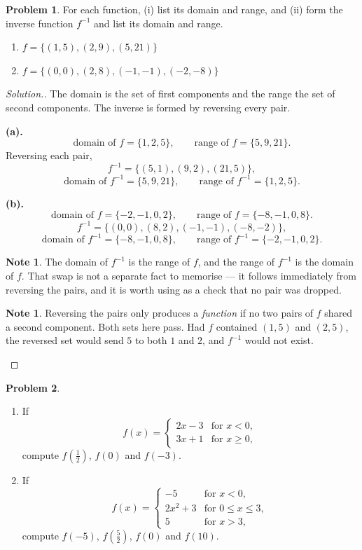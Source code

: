 \documentclass[11pt,a4paper]{article}
\theoremstyle{definition}
\newtheorem{note}[thm]{Note}
\newtheorem{problemx}{Problem}[section]
\newenvironment{problem}{\begin{problemx}}{\end{problemx}}
\newenvironment{solution}
  {\renewcommand{\qedsymbol}{}\begin{proof}[\textit{Solution}.]}
  {\end{proof}}
\begin{document}
\begin{problem}
For each function, (i) list its domain and range, and (ii) form the inverse function
$f^{-1}$ and list its domain and range.
\begin{enumerate}
\item[(a).] $f=\{(1,5),(2,9),(5,21)\}$
\item[(b).] $f=\{(0,0),(2,8),(-1,-1),(-2,-8)\}$
\end{enumerate}
\end{problem}

\begin{solution}
The domain is the set of first components and the range the set of second components.
The inverse is formed by reversing every pair.

\textbf{(a).}
$$\text{domain of } f=\{1,2,5\},\qquad \text{range of } f=\{5,9,21\}.$$
Reversing each pair,
$$f^{-1}=\{(5,1),(9,2),(21,5)\},$$
$$\text{domain of } f^{-1}=\{5,9,21\},\qquad \text{range of } f^{-1}=\{1,2,5\}.$$

\textbf{(b).}
$$\text{domain of } f=\{-2,-1,0,2\},\qquad \text{range of } f=\{-8,-1,0,8\}.$$
$$f^{-1}=\{(0,0),(8,2),(-1,-1),(-8,-2)\},$$
$$\text{domain of } f^{-1}=\{-8,-1,0,8\},\qquad \text{range of } f^{-1}=\{-2,-1,0,2\}.$$

\begin{note}
The domain of $f^{-1}$ is the range of $f$, and the range of $f^{-1}$ is the domain of
$f$. That swap is not a separate fact to memorise --- it follows immediately from
reversing the pairs, and it is worth using as a check that no pair was dropped.
\end{note}

\begin{note}
Reversing the pairs only produces a \emph{function} if no two pairs of $f$ shared a
second component. Both sets here pass. Had $f$ contained $(1,5)$ and $(2,5)$, the
reversed set would send $5$ to both $1$ and $2$, and $f^{-1}$ would not exist.
\end{note}
\end{solution}

\begin{problem}
\begin{enumerate}
\item[(a).] If
$$f(x)=\begin{cases} 2x-3 & \text{for } x<0,\\ 3x+1 & \text{for } x\geq 0,\end{cases}$$
compute $f\left(\frac{1}{2}\right)$, $f(0)$ and $f(-3)$.
\item[(b).] If
$$f(x)=\begin{cases} -5 & \text{for } x<0,\\ 2x^2+3 & \text{for } 0\leq x\leq 3,\\
5 & \text{for } x>3,\end{cases}$$
compute $f(-5)$, $f\left(\frac{5}{2}\right)$, $f(0)$ and $f(10)$.
\end{enumerate}
\end{problem}
\end{document}
